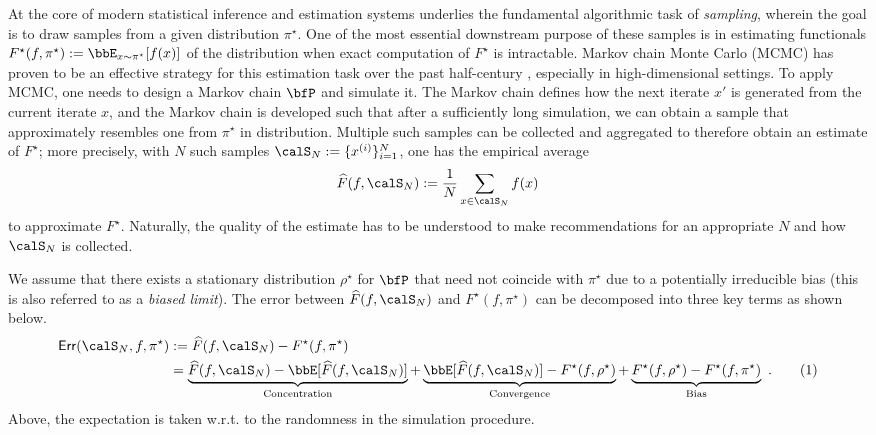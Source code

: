 \documentclass[11pt]{article}
\newcounter{ct}
\newcommand{\numberthis}{\addtocounter{equation}{1}\tag{\theequation}}
\begin{document}
At the core of modern statistical inference and estimation systems underlies the fundamental algorithmic task of \emph{sampling}, wherein the goal is to draw samples from a given distribution \(\pi^{\star}\).
One of the most essential downstream purpose of these samples is in estimating functionals \(F^{\star}(f, \pi^{\star}) := \bbE_{x \sim \pi^{\star}}[f(x)]\) of the distribution when exact computation of \(F^{\star}\) is intractable.
Markov chain Monte Carlo (MCMC) has proven to be an effective strategy for this estimation task over the past half-century \citep{brooks2011handbook}, especially in high-dimensional settings.
To apply MCMC, one needs to design a Markov chain \(\bfP\) and simulate it.
The Markov chain defines how the next iterate \(x'\) is generated from the current iterate \(x\), and the Markov chain is developed such that after a sufficiently long simulation, we can obtain a sample that approximately resembles one from \(\pi^{\star}\) in distribution.
Multiple such samples can be collected and aggregated to therefore obtain an estimate of \(F^{\star}\); more precisely, with \(N\) such samples \(\calS_{N} := \{x^{(i)}\}_{i=1}^{N}\), one has the empirical average
\begin{equation*}
    \widehat{F}(f, \calS_{N}) := \frac{1}{N}\sum_{x \in \calS_{N}} f(x)
\end{equation*}
to approximate \(F^{\star}\).
Naturally, the quality of the estimate has to be understood to make recommendations for an appropriate \(N\) and how \(\calS_{N}\) is collected.

We assume that there exists a stationary distribution \(\rho^{\star}\) for \(\bfP\) that need not coincide with \(\pi^{\star}\) due to a potentially irreducible bias (this is also referred to as a \emph{biased limit}).
The error between \(\widehat{F}(f, \calS_{N})\) and \(F^{\star}(f, \pi^{\star})\) can be decomposed into three key terms as shown below.
\begin{align*}
    \mathsf{Err}(\calS_{N}, f, \pi^{\star}) &:= \widehat{F}(f, \calS_{N}) - F^{\star}(f, \pi^{\star}) \\
    &= \underbrace{\widehat{F}(f, \calS_{N}) - \bbE[\widehat{F}(f, \calS_{N})]}_{\text{Concentration}} + \underbrace{\bbE[\widehat{F}(f, \calS_{N})] - F^{\star}(f, \rho^{\star})}_{\text{Convergence}} + \underbrace{F^{\star}(f, \rho^{\star}) - F^{\star}(f, \pi^{\star})}_{\text{Bias}}~.\numberthis\label{eq:error-decomp}
\end{align*}
Above, the expectation is taken w.r.t. to the randomness in the simulation procedure.
\end{document}
